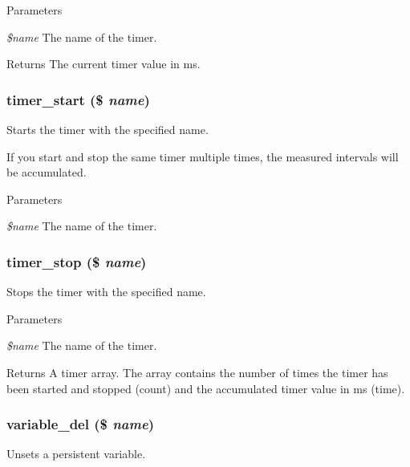 \begin{DoxyParams}{Parameters}
\item[{\em \$name}]The name of the timer.\end{DoxyParams}
\begin{DoxyReturn}{Returns}
The current timer value in ms. 
\end{DoxyReturn}
\hypertarget{bootstrap_8inc_a0aaa023d3c72be50ab4ac3f7e1c989c0}{
\subsubsection[{timer\_\-start}]{\setlength{\rightskip}{0pt plus 5cm}timer\_\-start (\$ {\em name})}}
\label{bootstrap_8inc_a0aaa023d3c72be50ab4ac3f7e1c989c0}
Starts the timer with the specified name.

If you start and stop the same timer multiple times, the measured intervals will be accumulated.


\begin{DoxyParams}{Parameters}
\item[{\em \$name}]The name of the timer. \end{DoxyParams}
\hypertarget{bootstrap_8inc_a8cb56b8962398895710c35a3584a7d11}{
\subsubsection[{timer\_\-stop}]{\setlength{\rightskip}{0pt plus 5cm}timer\_\-stop (\$ {\em name})}}
\label{bootstrap_8inc_a8cb56b8962398895710c35a3584a7d11}
Stops the timer with the specified name.


\begin{DoxyParams}{Parameters}
\item[{\em \$name}]The name of the timer.\end{DoxyParams}
\begin{DoxyReturn}{Returns}
A timer array. The array contains the number of times the timer has been started and stopped (count) and the accumulated timer value in ms (time). 
\end{DoxyReturn}
\hypertarget{bootstrap_8inc_a7850bff5f313f85335f418e6d87606b1}{
\subsubsection[{variable\_\-del}]{\setlength{\rightskip}{0pt plus 5cm}variable\_\-del (\$ {\em name})}}
\label{bootstrap_8inc_a7850bff5f313f85335f418e6d87606b1}
Unsets a persistent variable.

